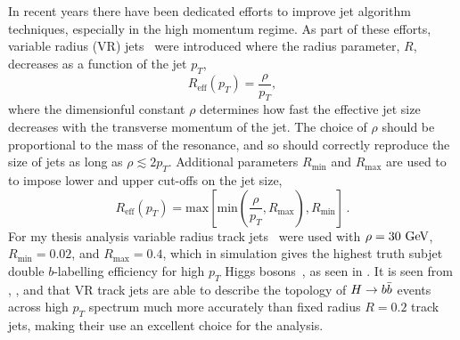 In recent years there have been dedicated efforts to improve jet algorithm techniques, especially in the high momentum regime.
As part of these efforts, variable radius (VR) jets~\cite{Krohn:2009zg,ATL-PHYS-PUB-2017-010} were introduced where the radius parameter, $R$, decreases as a function of the jet $p_{T}$,
\[
 R_{\mathrm{eff}} \left(p_{T}\right)= \frac{\rho}{p_{T}},
\]
where the dimensionful constant $\rho$ determines how fast the effective jet size decreases with the transverse momentum of the jet.
The choice of $\rho$ should be proportional to the mass of the resonance, and so should correctly reproduce the size of jets as long as $\rho \lesssim 2 p_{T}$.
Additional parameters $R_{\mathrm{min}}$ and $R_{\mathrm{max}}$ are used to to impose
lower and upper cut-offs on the jet size,
\[
 R_{\mathrm{eff}} \left(p_{T}\right)= \mathrm{max}\left[\mathrm{min}\left(\frac{\rho}{p_{T}},R_{\mathrm{max}}\right),R_{\mathrm{min}}\right]\,.
\]
For my thesis analysis variable radius track jets~\cite{Zenz:2010hfa} were used with $\rho=30~\mathrm{GeV}$, $R_{\mathrm{min}}=0.02$, and $R_{\mathrm{max}}=0.4$, which in simulation gives the highest truth subjet double $b$-labelling efficiency for high $p_{T}$ Higgs bosons~\cite{ATL-PHYS-PUB-2017-010}, as seen in .
It is seen from , , and  that VR track jets are able to describe the topology of $H \to b\bar{b}$ events across high $p_{T}$ spectrum much more accurately than fixed radius $R=0.2$ track jets, making their use an excellent choice for the analysis.

